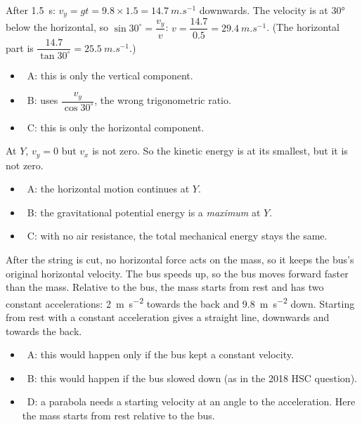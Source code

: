 \documentclass[12pt]{article}
\begin{document}
\begin{practiceanswers}
\begin{practiceans}
  After \qty{1.5}{s}: $v_y = gt = 9.8 \times 1.5 = \qty{14.7}{m.s^{-1}}$ downwards. The velocity is at
  \ang{30} below the horizontal, so $\sin 30^\circ = \dfrac{v_y}{v}$:
  $v = \dfrac{14.7}{0.5} = \qty{29.4}{m.s^{-1}}$. (The horizontal part is
  $\dfrac{14.7}{\tan 30^\circ} = \qty{25.5}{m.s^{-1}}$.)
  \begin{itemize}
    \item \xmark\ A: this is only the vertical component.
    \item \xmark\ B: uses $\dfrac{v_y}{\cos 30^\circ}$, the wrong trigonometric ratio.
    \item \xmark\ C: this is only the horizontal component.
  \end{itemize}
\end{practiceans}

\begin{practiceans}
  At $Y$, $v_y = 0$ but $v_x$ is not zero. So the kinetic energy is at its smallest, but it is not
  zero.
  \begin{itemize}
    \item \xmark\ A: the horizontal motion continues at $Y$.
    \item \xmark\ B: the gravitational potential energy is a \emph{maximum} at $Y$.
    \item \xmark\ C: with no air resistance, the total mechanical energy stays the same.
  \end{itemize}
\end{practiceans}

\begin{practiceans}
  After the string is cut, no horizontal force acts on the mass, so it keeps the bus's original
  horizontal velocity. The bus speeds up, so the bus moves forward faster than the mass. Relative
  to the bus, the mass starts from rest and has two constant accelerations: \qty{2}{m.s^{-2}}
  towards the back and \qty{9.8}{m.s^{-2}} down. Starting from rest with a constant acceleration
  gives a straight line, downwards and towards the back.
  \begin{itemize}
    \item \xmark\ A: this would happen only if the bus kept a constant velocity.
    \item \xmark\ B: this would happen if the bus slowed down (as in the 2018 HSC question).
    \item \xmark\ D: a parabola needs a starting velocity at an angle to the acceleration. Here the
          mass starts from rest relative to the bus.
  \end{itemize}
\end{practiceans}


\end{practiceanswers}
\end{document}
